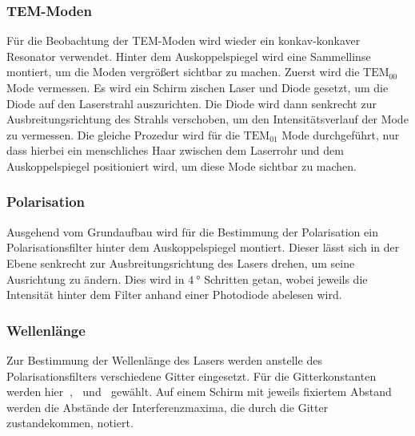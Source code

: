 \subsubsection{TEM-Moden}
Für die Beobachtung der TEM-Moden wird wieder ein konkav-konkaver Resonator verwendet. Hinter dem Auskoppelspiegel wird eine Sammellinse montiert, um die Moden
vergrößert sichtbar zu machen. Zuerst wird die $\text{TEM}_{00} $ Mode vermessen. Es wird ein Schirm zischen Laser und Diode gesetzt, um die Diode auf den Laserstrahl auszurichten. 
Die Diode wird dann senkrecht zur Ausbreitungsrichtung des Strahls verschoben, um den Intensitätsverlauf der Mode zu vermessen. 
Die gleiche Prozedur wird für die $\text{TEM}_{01} $ Mode durchgeführt, nur dass hierbei ein menschliches Haar zwischen dem Laserrohr und dem Auskoppelspiegel positioniert wird, um 
diese Mode sichtbar zu machen. 

\subsubsection{Polarisation}
Ausgehend vom Grundaufbau wird für die Bestimmung der Polarisation ein Polarisationsfilter hinter dem Auskoppelspiegel montiert. Dieser lässt sich in der Ebene senkrecht zur 
Ausbreitungsrichtung des Lasers drehen, um seine Ausrichtung zu ändern. Dies wird in $\SI{4}{\degree}$ Schritten getan, wobei jeweils die Intensität hinter dem Filter anhand einer 
Photodiode abelesen wird. 

\subsubsection{Wellenlänge}
Zur Bestimmung der Wellenlänge des Lasers werden anstelle des Polarisationsfilters verschiedene Gitter eingesetzt. Für die Gitterkonstanten werden hier $\SI{}{}$, $\SI{}{}$ und 
$\SI{}{}$ gewählt. Auf einem Schirm mit jeweils fixiertem Abstand werden die Abstände der Interferenzmaxima, die durch die Gitter zustandekommen, notiert. 
